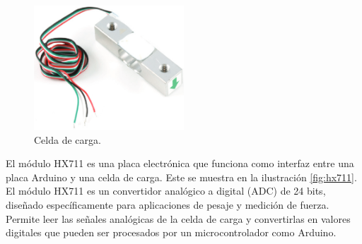 \begin{figure}[!ht]
    \centering
    \includegraphics[width=0.5\textwidth]{assets/metodos_herramientas/celda_carga.png}
    \caption{Celda de carga.}
    \label{fig:celda_carga}
\end{figure}
\newpage

El módulo HX711 es una placa electrónica que funciona como interfaz entre una placa Arduino y una celda de carga. Este se muestra en la ilustración \ref{fig:hx711}. El módulo HX711 es un convertidor analógico a digital (ADC) de 24 bits, diseñado específicamente para aplicaciones de pesaje y medición de fuerza. Permite leer las señales analógicas de la celda de carga y convertirlas en valores digitales que pueden ser procesados por un microcontrolador como Arduino.

